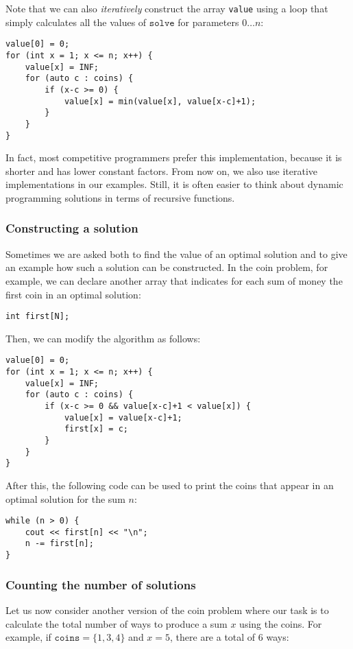 Note that we can also \emph{iteratively}
construct the array \texttt{value} using
a loop that simply calculates all the values
of $\texttt{solve}$ for parameters $0 \ldots n$:
\begin{lstlisting}
value[0] = 0;
for (int x = 1; x <= n; x++) {
    value[x] = INF;
    for (auto c : coins) {
        if (x-c >= 0) {
            value[x] = min(value[x], value[x-c]+1);
        }
    }
}
\end{lstlisting}

In fact, most competitive programmers prefer this
implementation, because it is shorter and has
lower constant factors.
From now on, we also use iterative implementations
in our examples.
Still, it is often easier to think about
dynamic programming solutions
in terms of recursive functions.


\subsubsection{Constructing a solution}

Sometimes we are asked both to find the value
of an optimal solution and to give
an example how such a solution can be constructed.
In the coin problem, for example,
we can declare another array
that indicates for
each sum of money the first coin 
in an optimal solution:
\begin{lstlisting}
int first[N];
\end{lstlisting}
Then, we can modify the algorithm as follows:
\begin{lstlisting}
value[0] = 0;
for (int x = 1; x <= n; x++) {
    value[x] = INF;
    for (auto c : coins) {
        if (x-c >= 0 && value[x-c]+1 < value[x]) {
            value[x] = value[x-c]+1;
            first[x] = c;
        }
    }
}
\end{lstlisting}
After this, the following code can be used to
print the coins that appear in an optimal solution for
the sum $n$:
\begin{lstlisting}
while (n > 0) {
    cout << first[n] << "\n";
    n -= first[n];
}
\end{lstlisting}

\subsubsection{Counting the number of solutions}

Let us now consider another version
of the coin problem where our task is to
calculate the total number of ways
to produce a sum $x$ using the coins.
For example, if $\texttt{coins}=\{1,3,4\}$ and
$x=5$, there are a total of 6 ways:

